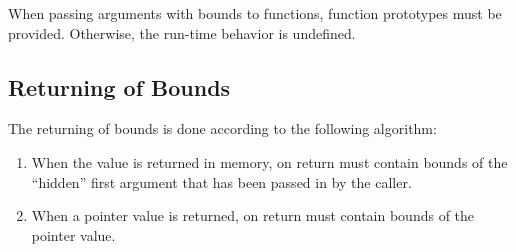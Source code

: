 When passing arguments with bounds to functions, function prototypes
must be provided.  Otherwise, the run-time behavior is undefined.

\subsection{Returning of Bounds}
The returning of bounds is done according to the following algorithm:
\begin{enumerate}
\item When the value is returned in memory, on return  must
  contain bounds of the ``hidden'' first argument that has been passed
  in by the caller.

\item When a pointer value is returned, on return  must
  contain bounds of the pointer value.
\end{enumerate}

